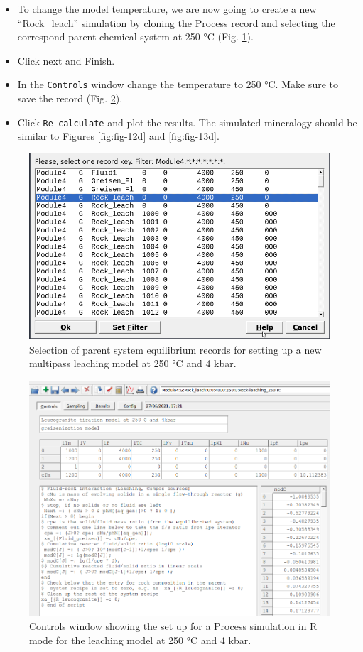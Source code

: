 \documentclass[
]{book}
\begin{document}
\begin{itemize}
\item
  To change the model temperature, we are now going to create a new ``Rock\_leach'' simulation by cloning the Process record and selecting the correspond parent chemical system at 250 °C (Fig. \ref{fig:fig-10d}).
\item
  Click next and Finish.
\item
  In the \texttt{Controls} window change the temperature to 250 °C. Make sure to save the record (Fig. \ref{fig:fig-11d}).
\item
  Click \texttt{Re-calculate} and plot the results. The simulated mineralogy should be similar to Figures \ref{fig:fig-12d} and \ref{fig:fig-13d}.
\end{itemize}

\begin{figure}
\includegraphics[width=0.7\linewidth]{figures/module4/fig-10} \caption{Selection of parent system equilibrium records for setting up a new multipass leaching model at 250 °C and 4 kbar.}\label{fig:fig-10d}
\end{figure}

\begin{figure}
\includegraphics[width=1\linewidth]{figures/module4/fig-11} \caption{Controls window showing the set up for a Process simulation in R mode for the leaching model at 250 °C and 4 kbar.}\label{fig:fig-11d}
\end{figure}
\end{document}
